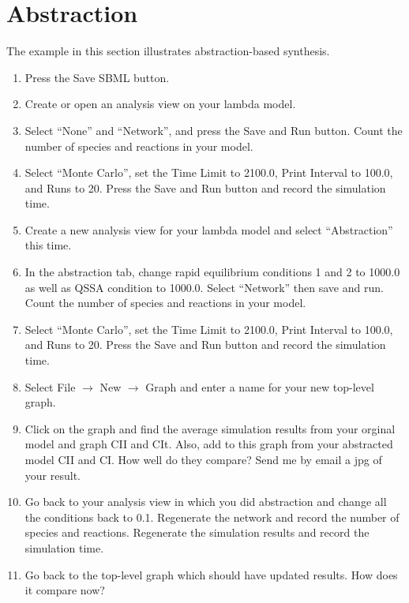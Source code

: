 \documentclass[titlepage,11pt]{article}
\begin{document}
\section{Abstraction}

The example in this section illustrates abstraction-based synthesis. 
\begin{enumerate}
\item Press the Save SBML button.

\item Create or open an analysis view on your lambda model.

\item Select ``None'' and ``Network'', and press the Save and Run button. 
      Count the number of species and reactions in your model.  

\item Select ``Monte Carlo'', set the Time Limit to 2100.0, Print Interval to
      100.0, and Runs to 20.  Press the Save and Run button and record the
      simulation time.

\item Create a new analysis view for your lambda model and 
      select  ``Abstraction'' this time.  

\item In the abstraction tab, change rapid equilibrium conditions 1 and 2 
      to 1000.0 as well as QSSA condition to 1000.0.  Select ``Network'' then 
      save and run.  Count the number of species and reactions in your model.

\item Select ``Monte Carlo'', set the Time Limit to 2100.0, Print Interval to
      100.0, and Runs to 20.  Press the Save and Run button and record the
      simulation time.

\item Select File $\rightarrow$ New $\rightarrow$ Graph and enter a name for
      your new top-level graph.

\item Click on the graph and find the average simulation results from your
      orginal model and graph CII and CIt.  Also, add to this graph from
      your abstracted model CII and CI.  How well do they compare?  
      Send me by email a jpg of your result.

\item Go back to your analysis view in which you did abstraction and change
      all the conditions back to 0.1.  Regenerate the network and record the
      number of species and reactions.  Regenerate the simulation results and
      record the simulation time.  

\item Go back to the top-level graph which should have updated results.  
      How does it compare now?
\end{enumerate}
\end{document}
